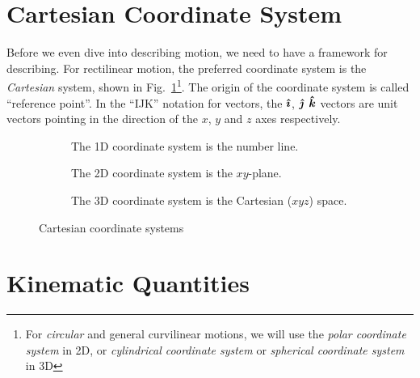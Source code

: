 \section{Cartesian Coordinate System}
Before we even dive into describing motion, we need to have a framework for
describing. For rectilinear motion, the preferred coordinate system is the
\emph{Cartesian} system, shown in Fig.~\ref{fig:cartesian}\footnote{For
\emph{circular} and general curvilinear motions, we will use the \emph{polar
coordinate system} in 2D, or \emph{cylindrical coordinate system} or
\emph{spherical coordinate system} in 3D}. The origin of the coordinate system
is called ``reference point''. In the ``IJK'' notation for vectors, the $\bm{\hat\imath}$,
$\bm{\hat\jmath}$ $\bm{\hat k}$ vectors are unit vectors pointing in the direction of the $x$,
$y$ and $z$ axes respectively.
\begin{figure}[ht]  
  \centering
  \begin{subfigure}{.3\linewidth}
    \centering
    \caption{The 1D coordinate system is the number line.}
  \end{subfigure}  
  \begin{subfigure}{.3\linewidth}
    \centering
    \caption{The 2D coordinate system is the $xy$-plane.}
  \end{subfigure}
  \begin{subfigure}{.3\linewidth}
    \centering
    \caption{The 3D coordinate system is the Cartesian ($xyz$) space.}
  \end{subfigure}
  \caption{Cartesian coordinate systems}
  \label{fig:cartesian}
\end{figure}



\section{Kinematic Quantities}

